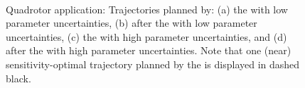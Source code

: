 \begin{figure} [h!]
    \centering
    \\
    \caption{Quadrotor application: Trajectories planned by: (a) the  with low parameter uncertainties, (b) after the  with low parameter uncertainties, (c) the  with high parameter uncertainties, and (d) after the  with high parameter uncertainties.
    Note that one (near) sensitivity-optimal trajectory planned by the  is displayed in dashed black.}%
    \label{fig:2way}%
\end{figure}


